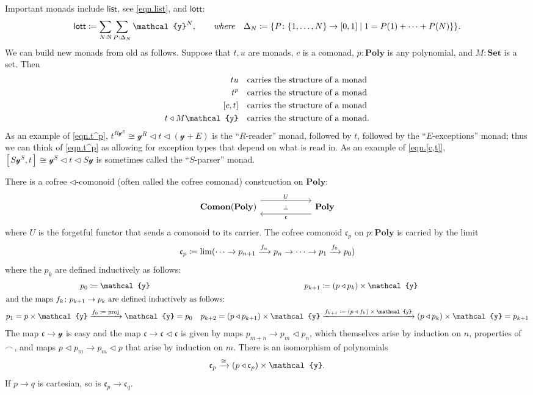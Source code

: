 \documentclass[11pt, one side, article]{memoir}
\theoremstyle{definition}
\theoremstyle{plain}
\newcommand{\Cat}[1]{\mathbf{#1}}%
\newcommand{\Fun}[1]{\mathsf{#1}}%
\newcommand{\To}[2][]{\xrightarrow[#1]{\tn{$#2$}}}
\newcommand{\tn}[1]{\textnormal{#1}}
\newcommand{\nn}{\mathbb{N}}
\newcommand{\smset}{\Cat{Set}}
\newcommand{\List}{\Fun{list}}
\newcommand{\lott}{\Fun{lott}}
\newcommand{\yon}{{\mathcal{y}}}
\newcommand{\poly}{\Cat{Poly}}
\newcommand{\0}{\textsf{0}}
\newcommand{\1}{\tn{\textsf{1}}}
\newcommand{\tri}{\mathbin{\triangleleft}}
\newcommand{\cofree}{\mathfrak{c}}
\newcommand{\indexcoclscale}[1]{\scalebox{.7}{#1}}
\newcommand{\cocl}[1]{
	\scriptsize\overset{\,\indexcoclscale{$#1$}}{\frown}\normalsize
}
\newcommand{\hi}[4][]{#1 #2 \tn{\textit{#4}} #3}
\newcommand{\where}[1][,]{\hi[#1]{\qquad}{\quad}{where}}
\begin{document}
Important monads include $\List$, see \eqref{eqn.list}, and $\lott$:
\begin{equation}
	\lott\coloneqq\sum_{N:\nn}\sum_{P:\Delta_N}\yon^N
	\where
	\Delta_N\coloneqq\{P\colon\{1,\ldots,N\}\to[0,1]\mid1=P(1)+\cdots+P(N)\}\}.
\end{equation}
We can build new monads from old as follows. Suppose that $t,u$ are monads, $c$ is a comonad, $p:\poly$ is any polynomial, and $M:\smset$ is a set. Then
\begin{align}
	tu&\quad\tn{carries the structure of a monad}\\
	\label{eqn.t^p}
	t^p&\quad\tn{carries the structure of a monad}\\
	\label{eqn.[c,t]}
	[c,t]&\quad\tn{carries the structure of a monad}\\
	t\tri M\yon&\quad\tn{carries the structure of a monad}.
\end{align}
As an example of \eqref{eqn.t^p}, $t^{R\yon^E}\cong\yon^R\tri t\tri(\yon+E)$ is the ``$R$-reader'' monad, followed by $t$, followed by the ``$E$-exceptions'' monad; thus we can think of \eqref{eqn.t^p} as allowing for exception types that depend on what is read in. As an example of \eqref{eqn.[c,t]}, $[S\yon^S,t]\cong\yon^S\tri t\tri S\yon$ is sometimes called the ``$S$-parser'' monad.


There is a cofree $\tri$-comonoid (often called the cofree comonad) construction on $\poly$:
\begin{equation}\label{eqn.cofree}
\begin{tikzcd}[column sep=60pt]
	\Cat{Comon}(\poly)
  	\ar[from=r, shift left=8pt, "\cofree"]
		\ar[from=r, phantom, "\scriptstyle\bot"]
  	&
	\poly
		\ar[from=l, shift right=-8pt, "U"]
\end{tikzcd}
\end{equation}
where $U$ is the forgetful functor that sends a comonoid to its carrier. The cofree comonoid $\cofree_p$ on $p:\poly$ is carried by the limit
\begin{equation}
\cofree_p\coloneqq\lim(\cdots\to p_{n+1}\To{f_n} p_n\to\cdots\to p_1\To{f_0} p_0)
\end{equation}
where the $p_k$ are defined inductively as follows:
\begin{align}
	p_0&\coloneqq\yon&p_{k+1}&\coloneqq (p\tri p_k)\times\yon\\
\intertext{and the maps $f_k\colon p_{k+1}\to p_k$ are defined inductively as follows:}
	p_1=p\times\yon&\To{f_0\coloneqq\tn{proj}}\yon=p_0&p_{k+2}=(p\tri p_{k+1})\times\yon&\To{f_{k+1}\coloneqq(p\tri f_k)\times\yon}(p\tri p_{k})\times\yon=p_{k+1}
\end{align}
The map $\cofree\to\yon$ is easy and the map $\cofree\to\cofree\tri\cofree$ is given by maps $p_{m+n}\to p_m\tri p_n$, which themselves arise by induction on $n$, properties of $\cocl{}$, and maps $p\tri p_m\to p_m\tri p$ that  arise by induction on $m$. There is an isomorphism of polynomials
\begin{equation}\label{eqn.cofree_iso}
	\cofree_p\To{\cong} (p\tri\cofree_p)\times\yon.
\end{equation}
If $p\to q$ is cartesian, so is $\cofree_p\to\cofree_q$.
\end{document}
